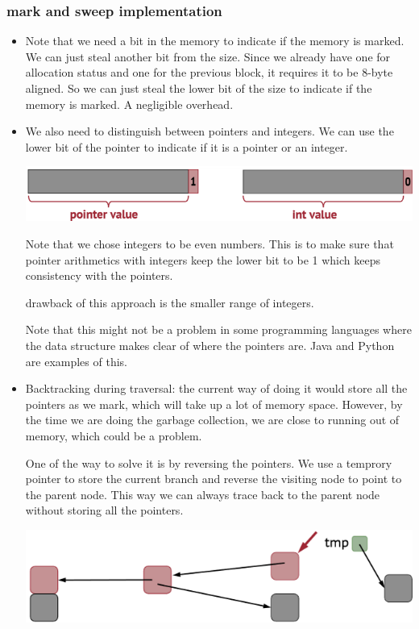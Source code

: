 \documentclass[letterpaper,12pt]{article}
\begin{document}
\subsubsection{mark and sweep implementation}
\begin{itemize}
    \item Note that we need a bit in the memory to indicate if the memory is marked. We
          can just steal another bit from the size. Since we already have one for
          allocation status and one for the previous block, it requires it to be 8-byte
          aligned. So we can just steal the lower bit of the size to indicate if the
          memory is marked. A negligible overhead.
    \item We also need to distinguish between pointers and integers. We can use the lower
          bit of the pointer to indicate if it is a pointer or an integer.

          \includegraphics[scale = 0.6]{./Images/Pointer and Integer distinguishing.png}

          Note that we chose integers to be even numbers. This is to make sure that
          pointer arithmetics with integers keep the lower bit to be 1 which keeps
          consistency with the pointers.

          drawback of this approach is the smaller range of integers.

          Note that this might not be a problem in some programming languages where the
          data structure makes clear of where the pointers are. Java and Python are
          examples of this.
    \item Backtracking during traversal: the current way of doing it would store all the
          pointers as we mark, which will take up a lot of memory space. However, by the
          time we are doing the garbage collection, we are close to running out of
          memory, which could be a problem.

          One of the way to solve it is by reversing the pointers. We use a temprory
          pointer to store the current branch and reverse the visiting node to point to
          the parent node. This way we can always trace back to the parent node without
          storing all the pointers.

          \includegraphics[scale = 0.6]{Images/BackTracking.png}


\end{itemize}
\end{document}

